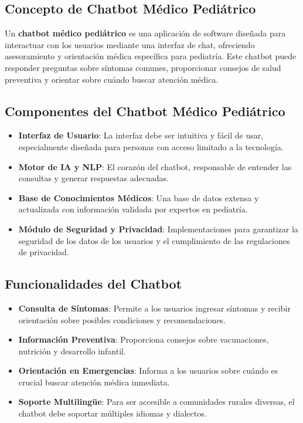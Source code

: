 \subsection{Concepto de Chatbot Médico Pediátrico}

Un \textbf{chatbot médico pediátrico} es una aplicación de software diseñada para interactuar con los usuarios mediante una interfaz de chat, ofreciendo asesoramiento y orientación médica específica para pediatría. Este chatbot puede responder preguntas sobre síntomas comunes, proporcionar consejos de salud preventiva y orientar sobre cuándo buscar atención médica.

\subsection{Componentes del Chatbot Médico Pediátrico}

\begin{itemize}
    \item \textbf{Interfaz de Usuario}: La interfaz debe ser intuitiva y fácil de usar, especialmente diseñada para personas con acceso limitado a la tecnología.
    \item \textbf{Motor de IA y NLP}: El corazón del chatbot, responsable de entender las consultas y generar respuestas adecuadas.
    \item \textbf{Base de Conocimientos Médicos}: Una base de datos extensa y actualizada con información validada por expertos en pediatría.
    \item \textbf{Módulo de Seguridad y Privacidad}: Implementaciones para garantizar la seguridad de los datos de los usuarios y el cumplimiento de las regulaciones de privacidad.
\end{itemize}

\subsection{Funcionalidades del Chatbot}

\begin{itemize}
    \item \textbf{Consulta de Síntomas}: Permite a los usuarios ingresar síntomas y recibir orientación sobre posibles condiciones y recomendaciones.
    \item \textbf{Información Preventiva}: Proporciona consejos sobre vacunaciones, nutrición y desarrollo infantil.
    \item \textbf{Orientación en Emergencias}: Informa a los usuarios sobre cuándo es crucial buscar atención médica inmediata.
    \item \textbf{Soporte Multilingüe}: Para ser accesible a comunidades rurales diversas, el chatbot debe soportar múltiples idiomas y dialectos.
\end{itemize}

